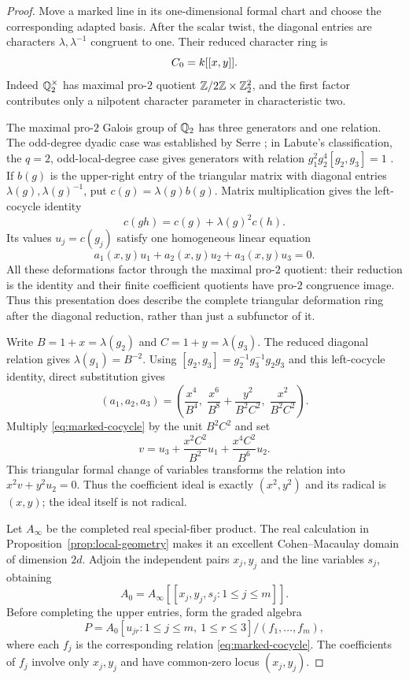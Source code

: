 \begin{proof}
Move a marked line in its one-dimensional formal chart and choose
the corresponding adapted basis.  After the scalar twist, the
diagonal entries are characters $\lambda,\lambda^{-1}$ congruent
to one.  Their reduced character ring is
\[
C_0=k[[x,y]].
\]
Indeed $\mathbb Q_2^\times$ has maximal pro-$2$ quotient
$\mathbb Z/2\mathbb Z\times\mathbb Z_2^2$, and the first factor contributes only a
nilpotent character parameter in characteristic two.

The maximal pro-$2$ Galois group of $\mathbb Q_2$ has three generators
and one relation. The odd-degree dyadic case was established by
Serre \cite[Sections~4.4 and~8]{Serre1964Demushkin}; in Labute's
classification, the $q=2$, odd-local-degree case gives generators
with relation
$g_1^2g_2^4[g_2,g_3]=1$
\cite[\S5, Theorem~8]{Demushkin}. If $b(g)$ is the upper-right entry
of the triangular matrix with diagonal entries
$\lambda(g),\lambda(g)^{-1}$, put $c(g)=\lambda(g)b(g)$. Matrix
multiplication gives the left-cocycle identity
\[
c(gh)=c(g)+\lambda(g)^2c(h).
\]
Its values $u_j=c(g_j)$ satisfy one homogeneous linear equation
\begin{equation}\label{eq:marked-cocycle}
a_1(x,y)u_1+a_2(x,y)u_2+a_3(x,y)u_3=0.
\end{equation}
All these deformations factor through the maximal pro-$2$ quotient:
their reduction is the identity and their finite coefficient
quotients have pro-$2$ congruence image.  Thus this presentation
does describe the complete triangular deformation ring after the
diagonal reduction, rather than just a subfunctor of it.

Write $B=1+x=\lambda(g_2)$ and $C=1+y=\lambda(g_3)$.
The reduced diagonal relation gives $\lambda(g_1)=B^{-2}$.
Using $[g_2,g_3]=g_2^{-1}g_3^{-1}g_2g_3$ and this left-cocycle
identity, direct substitution gives
\[
 (a_1,a_2,a_3)=
 \left(\frac{x^4}{B^4},\;
       \frac{x^6}{B^8}+\frac{y^2}{B^2C^2},\;
       \frac{x^2}{B^2C^2}\right).
\]
Multiply \eqref{eq:marked-cocycle} by the unit $B^2C^2$ and set
\[
 v=u_3+\frac{x^2C^2}{B^2}u_1+\frac{x^4C^2}{B^6}u_2.
\]
This triangular formal change of variables transforms the relation
into $x^2v+y^2u_2=0$.  Thus the coefficient ideal is exactly
$(x^2,y^2)$ and its radical is $(x,y)$; the ideal itself is not
radical.

Let $A_\infty$ be the completed real special-fiber product.  The
real calculation in Proposition~\ref{prop:local-geometry} makes it
an excellent Cohen--Macaulay domain of dimension $2d$.  Adjoin the
independent pairs $x_j,y_j$ and the line variables $s_j$, obtaining
\[
A_0=A_\infty[[x_j,y_j,s_j:1\le j\le m]].
\]
Before completing the upper entries, form the graded algebra
\begin{equation}\label{eq:marked-polynomial-product}
P=A_0[u_{jr}:1\le j\le m,\ 1\le r\le3]/(f_1,\ldots,f_m),
\end{equation}
where each $f_j$ is the corresponding relation
\eqref{eq:marked-cocycle}.  The coefficients of $f_j$ involve only
$x_j,y_j$ and have common-zero locus $(x_j,y_j)$.


\end{proof}
